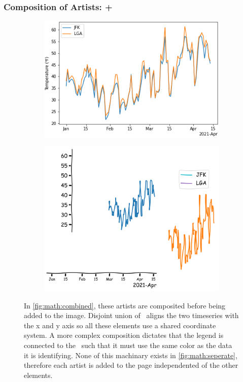 \documentclass[../main.tex]{subfiles}
\begin{document}
\subsubsection{Composition of Artists: +}
\begin{figure}[H]
\begin{subfigure}{.5\textwidth}
    \includegraphics[width=1\textwidth]{figures/math/combined_artist.png}
    \caption{}
    \label{fig:math:combined}    
\end{subfigure}
\begin{subfigure}{.5\textwidth}
    \includegraphics[width=1\textwidth]{figures/math/exploding_artist.png}
    \caption{}
    \label{fig:math:seperate}
\end{subfigure}
\caption{ In \autoref{fig:math:combined}, these artists are composited before being added to the image. Disjoint union of \dtotal\ aligns the two timeseries with the x and y axis so all these elements use a shared coordinate system. A more complex composition dictates that the legend is connected to the \dtotal\ such that it must use the same color as the data it is identifying. None of this machinary exists in \autoref{fig:math:seperate}, therefore each artist is added to the page independented of the other elements.}
\label{fig:artist_plus}
\end{figure}
\end{document}
